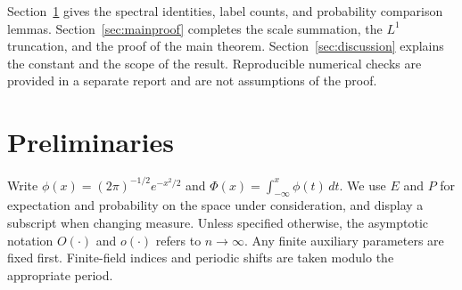 \documentclass[a4paper,11pt]{article}
\theoremstyle{remark}
\begin{document}
Section~\ref{sec:prelim} gives the spectral identities, label counts, and probability comparison lemmas. Section~\ref{sec:mainproof} completes the scale summation, the $L^1$ truncation, and the proof of the main theorem. Section~\ref{sec:discussion} explains the constant and the scope of the result. Reproducible numerical checks are provided in a separate report and are not assumptions of the proof.

\section{Preliminaries}\label{sec:prelim}
Write $\phi(x)=(2\pi)^{-1/2}e^{-x^2/2}$ and $\Phi(x)=\int_{-\infty}^x\phi(t)\,dt$.
We use $E$ and $P$ for expectation and probability on the space under consideration, and display a subscript when changing measure.
Unless specified otherwise, the asymptotic notation $O(\cdot)$ and $o(\cdot)$ refers to $n\to\infty$.
Any finite auxiliary parameters are fixed first. Finite-field indices and periodic shifts are taken modulo the appropriate period.
\end{document}
